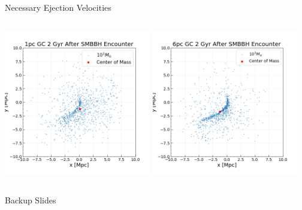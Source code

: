 \documentclass[aspectratio=169]{beamer}
\begin{document}
\begin{frame}
  {Necessary Ejection Velocities}
  \begin{columns}
    \includegraphics[width=6.4cm, height=6.4cm]{./Images/1pc2Gyr_scatter.png}
    \centering
    \includegraphics[width=6.4cm, height=6.4cm]{./Images/6pc2Gyr_scatter.png}
    \centering
  \end{columns}
\end{frame}

\backupbegin

\begin{frame}
  {}
  \begin{center}
    \Huge Backup Slides
  \end{center}
\end{frame}
\end{document}
